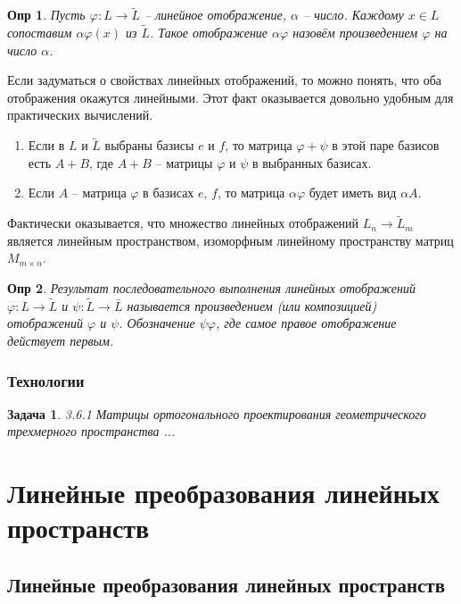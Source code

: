 \documentclass[a4paper,12pt]{article}
\newtheorem*{definition}{Опр}
\newtheorem*{prob}{Задача}
\begin{document}
\begin{definition}
	Пусть $\varphi: L \to \tilde{L}$ -- линейное отображение, $\alpha$ -- число. Каждому $x \in L$ сопоставим $\alpha \varphi(x)$ из $\tilde{L}$. Такое отображение $\alpha \varphi$ назовём произведением $\varphi$ на число $\alpha$.
\end{definition}

Если задуматься о свойствах линейных отображений, то можно понять, что оба отображения окажутся линейными. Этот факт оказывается довольно удобным для практических вычислений. 

\begin{enumerate}
	\item Если в $L$ и $\tilde{L}$ выбраны базисы $e$ и $f$, то матрица $\varphi + \psi$ в этой паре базисов есть $A + B$, где $A + B$ -- матрицы $\varphi$ и $\psi$ в выбранных базисах.
	\item Если $A$ -- матрица $\varphi$ в базисах $e$, $f$, то матрица $\alpha \varphi$ будет иметь вид $\alpha A$.
\end{enumerate}

Фактически оказывается, что множество линейных отображений $L_n \to \tilde{L}_m$ является линейным пространством, изоморфным линейному пространству матриц $M_{m \times n}$.

\begin{definition}
	Результат последовательного выполнения линейных отображений $\varphi: L \to \tilde{L}$ и $\psi: \tilde{L}\to \bar{L}$ называется произведением (или композицией) отображений $\varphi$ и $\psi$. Обозначение $\psi \varphi$, где самое правое отображение действует первым.
\end{definition}

\subsubsection{Технологии}

\begin{prob}
	3.6.1 Матрицы ортогонального проектирования геометрического трехмерного пространства ...
\end{prob}

\section{Линейные преобразования линейных пространств}
\subsection{Линейные преобразования линейных пространств}
\end{document}

